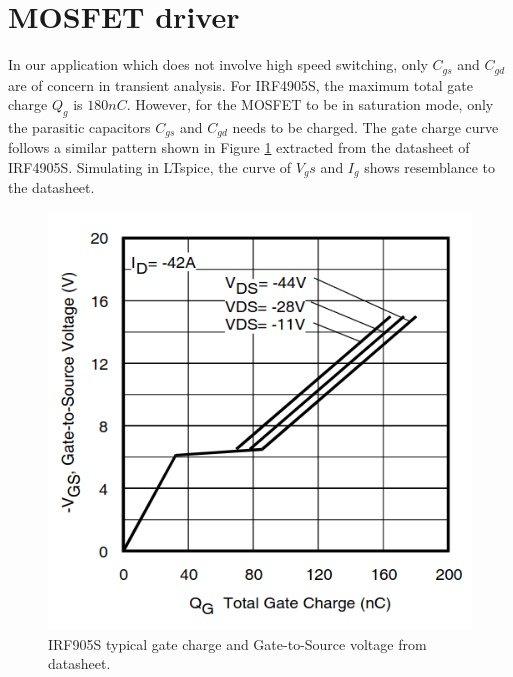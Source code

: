 \documentclass[main.tex]{subfiles}
\begin{document}
    \section{MOSFET driver}
    
    \justify
    In our application which does not involve high speed switching, only $C_{gs}$ and $C_{gd}$ are of concern in transient analysis. For IRF4905S, the maximum total gate charge $Q_g$ is $180nC$. However, for the MOSFET to be in saturation mode, only the parasitic capacitors $C_{gs}$ and $C_{gd}$ needs to be charged. The gate charge curve follows a similar pattern shown in Figure \ref{fig:gate_charge_curve} extracted from the datasheet of IRF4905S. Simulating in LTspice, the curve of $V_gs$ and $I_g$ shows resemblance to the datasheet.

    \begin{figure}[!h]
        \centerline{\includegraphics[scale=0.5]{media/gate_charge_curve.png}}
        \caption{IRF905S typical gate charge and Gate-to-Source voltage from datasheet.}
        \label{fig:gate_charge_curve}
    \end{figure}
\end{document}
